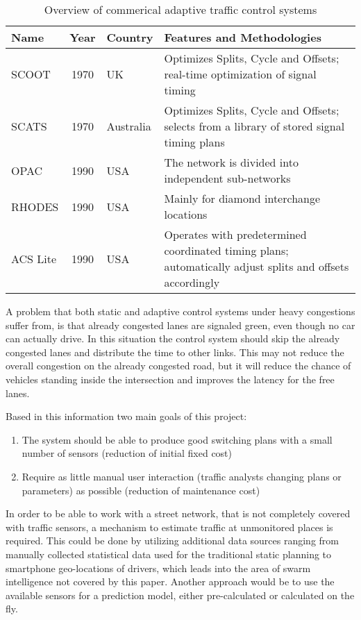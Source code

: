 \begin{table}[ht!]
	\centering
	\begin{longtabu}{l|cl|p{9cm}}
		\rowfont{\bfseries}
		Name & Year & Country & Features and Methodologies \\
		\hline\hline
		SCOOT & 1970 & UK & Optimizes Splits, Cycle and Offsets; real-time optimization of signal timing \\
		\hline
		SCATS & 1970 & Australia & Optimizes Splits, Cycle and Offsets; selects from a library of stored signal timing plans \\
		\hline
		OPAC & 1990 & USA & The network is divided into independent sub-networks \\
		\hline
		RHODES & 1990 & USA & Mainly for diamond interchange locations \\
		\hline
		ACS Lite & 1990 & USA & Operates with predetermined coordinated timing plans; automatically adjust splits and offsets accordingly \\
	\end{longtabu}
	\label{atcs_overview}
	\caption{Overview of commerical adaptive traffic control systems}
\end{table}

A problem that both static and adaptive control systems under heavy congestions suffer from, is that already congested lanes are signaled green, even though no car can actually drive. In this situation the control system should skip the already congested lanes and distribute the time to other links. This may not reduce the overall congestion on the already congested road, but it will reduce the chance of vehicles standing inside the intersection and improves the latency for the free lanes.

Based in this information two main goals of this project:

\begin{enumerate}
	\item The system should be able to produce good switching plans with a small number of sensors (reduction of initial fixed cost)
	\item Require as little manual user interaction (traffic analysts changing plans or parameters) as possible (reduction of maintenance cost)
\end{enumerate}

In order to be able to work with a street network, that is not completely covered with traffic sensors, a mechanism to estimate traffic at unmonitored places is required. This could be done by utilizing additional data sources ranging from manually collected statistical data used for the traditional static planning to smartphone geo-locations of drivers, which leads into the area of swarm intelligence not covered by this paper. Another approach would be to use the available sensors for a prediction model, either pre-calculated or calculated on the fly.

